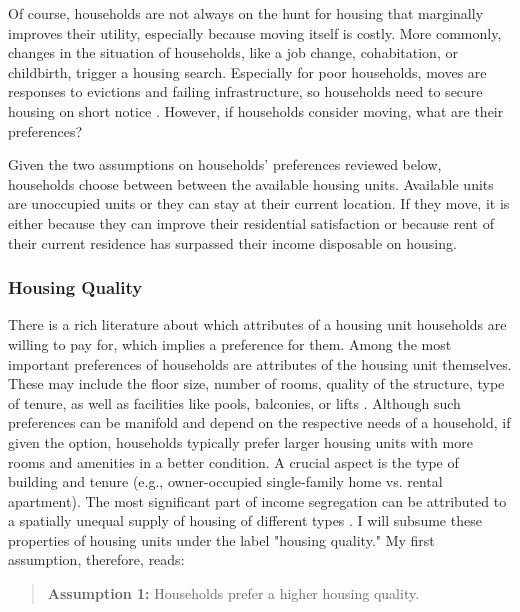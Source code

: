 Of course, households are not always on the hunt for housing that marginally improves their utility, especially because moving itself is costly. More commonly, changes in the situation of households, like a job change, cohabitation, or childbirth, trigger a housing search. Especially for poor households, moves are responses to evictions and failing infrastructure, so households need to secure housing on short notice \citep{delucaNotJustLateral2020}. However, if households consider moving, what are their preferences? 

Given the two assumptions on households' preferences reviewed below, households choose between between the available housing units. Available units are unoccupied units or they can stay at their current location. If they move, it is either because they can improve their residential satisfaction or because rent of their current residence has surpassed their income disposable on housing. 

\subsubsection{Housing Quality}

There is a rich literature about which attributes of a housing unit households are willing to pay for, which implies a preference for them. Among the most important preferences of households are attributes of the housing unit themselves. These may include the floor size, number of rooms, quality of the structure, type of tenure, as well as facilities like pools, balconies, or lifts \citep{chauCriticalReviewLiterature2003, bayerEquilibriumModelSorting2004, bruecknerLecturesUrbanEconomics2011}. Although such preferences can be manifold and depend on the respective needs of a household, if given the option, households typically prefer larger housing units with more rooms and amenities in a better condition. A crucial aspect is the type of building and tenure (e.g., owner-occupied single-family home vs. rental apartment). The most significant part of income segregation can be attributed to a spatially unequal supply of housing of different types \citep{loufPatternsResidentialSegregation2016, oecdDividedCitiesUnderstanding2018, owensBuildingInequalityHousing2019}. I will subsume these properties of housing units under the label "housing quality." My first assumption, therefore, reads:

\begin{quotation}
\textbf{Assumption 1:} Households prefer a higher housing quality.
\end{quotation}

